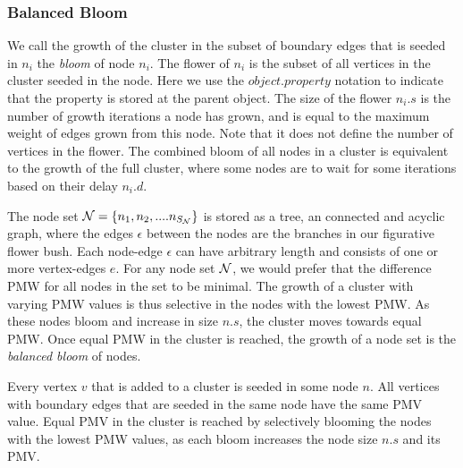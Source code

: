 \subsubsection{Balanced Bloom}

We call the growth of the cluster in the subset of boundary edges that is seeded in $n_i$ the \emph{bloom} of node $n_i$. The flower of $n_i$ is the subset of all vertices in the cluster seeded in the node. Here we use the $object.property$ notation to indicate that the property is stored at the parent object. The size of the flower $n_i.s$ is the number of growth iterations a node has grown, and is equal to the maximum weight of edges grown from this node. Note that it does not define the number of vertices in the flower. The combined bloom of all nodes in a cluster is equivalent to the growth of the full cluster, where some nodes are to wait for some iterations based on their delay $n_i.d$.

The node set $\mathcal{N} = \{n_1, n_2, .... n_{S_{\mathcal{N}}}\}$ is stored as a tree, an connected and acyclic graph, where the edges $\epsilon$ between the nodes are the branches in our figurative flower bush. Each node-edge $\epsilon$ can have arbitrary length and consists of one or more vertex-edges $e$. For any node set $\mathcal{N}$, we would prefer that the difference PMW for all nodes in the set to be minimal. The growth of a cluster with varying PMW values is thus selective in the nodes with the lowest PMW. As these nodes bloom and increase in size $n.s$, the cluster moves towards equal PMW. Once equal PMW in the cluster is reached, the growth of a node set is the \emph{balanced bloom} of nodes.

\begin{theorem}\label{th:balancedbloom}
  Every vertex $v$ that is added to a cluster is seeded in some node $n$. All vertices with boundary edges that are seeded in the same node have the same PMV value. Equal PMV in the cluster is reached by selectively blooming the nodes with the lowest PMW values, as each bloom increases the node size $n.s$ and its PMV.
\end{theorem}

